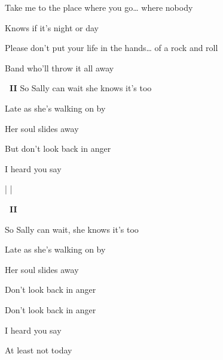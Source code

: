 \begin{song}
\bigskip

Take me to the place where you go… where nobody \par
{}Knows  if it’s night or day  \par
{}Please don’t put your life in the hands… of a rock and roll \par
{}Band  who’ll throw it all away  \par

\bigskip

\Prechorus

\bigskip

\begin{chorusbox}{\Chorus\textbf{\smaller\ II}}
So Sally can wait she knows it’s too \par
{}Late as she's walking on by  \par
Her soul slides away  \par
But don’t look back in anger  \par
I heard you say  \par
\end{chorusbox}

\bigskip

    \par
{}  |    |  \par

\bigskip

\Chorus\textbf{\smaller\ II}

\bigskip

So Sally can wait, she knows it’s too \par
{}Late as she's walking on by  \par
Her soul slides away \par
Don’t look back in anger \par
Don’t look back in anger \par
I heard you say    \par
{}  At least not today \par

\end{song}
